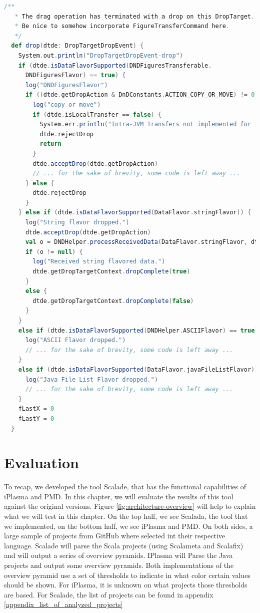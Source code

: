 \documentclass[onecolumn]{article}
\let\oldsection\section
\renewcommand\section{\clearpage\oldsection}
\begin{document}
\begin{lstlisting}[language=scala, basicstyle=\ttfamily\small]
  /**
   * The drag operation has terminated with a drop on this DropTarget.
   * Be nice to somehow incorporate FigureTransferCommand here.
   */
  def drop(dtde: DropTargetDropEvent) {
    System.out.println("DropTargetDropEvent-drop")
    if (dtde.isDataFlavorSupported(DNDFiguresTransferable.
      DNDFiguresFlavor) == true) {
      log("DNDFiguresFlavor")
      if ((dtde.getDropAction & DnDConstants.ACTION_COPY_OR_MOVE) != 0) {
        log("copy or move")
        if (dtde.isLocalTransfer == false) {
          System.err.println("Intra-JVM Transfers not implemented for figures yet.")
          dtde.rejectDrop
          return
        }
        dtde.acceptDrop(dtde.getDropAction)
        // ... for the sake of brevity, some code is left away ...
      } else {
        dtde.rejectDrop
      }
    } else if (dtde.isDataFlavorSupported(DataFlavor.stringFlavor)) {
      log("String flavor dropped.")
      dtde.acceptDrop(dtde.getDropAction)
      val o = DNDHelper.processReceivedData(DataFlavor.stringFlavor, dtde.getTransferable)
      if (o != null) {
        log("Received string flavored data.")
        dtde.getDropTargetContext.dropComplete(true)
      }
      else {
        dtde.getDropTargetContext.dropComplete(false)
      }
    }
    else if (dtde.isDataFlavorSupported(DNDHelper.ASCIIFlavor) == true) {
      log("ASCII Flavor dropped.")
      // ... for the sake of brevity, some code is left away ...
    }
    else if (dtde.isDataFlavorSupported(DataFlavor.javaFileListFlavor)) {
      log("Java File List Flavor dropped.")
      // ... for the sake of brevity, some code is left away ...
    }
    fLastX = 0
    fLastY = 0
  }
\end{lstlisting}


\section{Evaluation} \label{section_evaluation}
To recap, we developed the tool Scalade, that has the functional capabilities of iPlasma and PMD. In this chapter, we will evaluate the results of this tool against the original versions. Figure \ref{fig:architecture-overview} will help to explain what we will test in this chapter. On the top half, we see Scalada, the tool that we implemented, on the bottom half, we see iPlasma and PMD. On both sides, a large sample of projects from GitHub where selected int their respective language. Scalade will parse the Scala projects (using Scalameta and Scalafix) and will output a series of overview pyramids. IPlasma will Parse the Java projects and output some overview pyramids. Both implementations of the overview pyramid use a set of thresholds to indicate in what color certain values should be shown. For iPlasma, it is unknown on what projects those thresholds are based. For Scalade, the list of projects can be found in appendix \ref{appendix_list_of_analyzed_projects}
\end{document}
